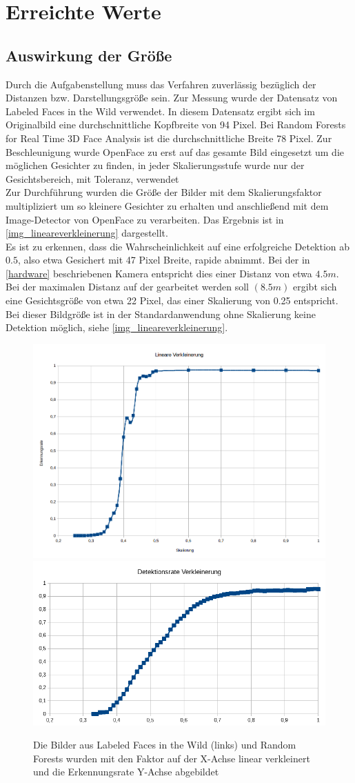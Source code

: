 \section{Erreichte Werte}
\subsection{Auswirkung der Größe}
Durch die Aufgabenstellung muss das Verfahren zuverlässig bezüglich der Distanzen bzw. Darstellungsgröße sein. Zur Messung wurde der Datensatz von Labeled Faces in the Wild \cite{database_Face} verwendet. In diesem Datensatz ergibt sich im Originalbild eine durchschnittliche Kopfbreite von 94 Pixel. Bei Random Forests for Real Time 3D Face Analysis \cite{database_Face_Ori} ist die durchschnittliche Breite 78 Pixel. Zur Beschleunigung wurde OpenFace zu erst auf das gesamte Bild eingesetzt um die möglichen Gesichter zu finden, in jeder Skalierungsstufe wurde nur der Gesichtsbereich, mit Toleranz, verwendet\\
Zur Durchführung wurden die Größe der Bilder mit dem Skalierungsfaktor multipliziert um so kleinere Gesichter zu erhalten und anschließend mit dem Image-Detector von OpenFace zu verarbeiten. Das Ergebnis ist in \autoref{img_lineareverkleinerung} dargestellt.\\
Es ist zu erkennen, dass die Wahrscheinlichkeit auf eine erfolgreiche Detektion ab $0.5$, also etwa Gesichert mit 47 Pixel Breite, rapide abnimmt. Bei der in \autoref{hardware} beschriebenen Kamera entspricht dies einer Distanz von etwa $4.5m$.\\
Bei der maximalen Distanz auf der gearbeitet werden soll $(8.5m)$ ergibt sich eine Gesichtsgröße von etwa 22 Pixel, das einer Skalierung von 0.25 entspricht. Bei dieser Bildgröße ist in der Standardanwendung ohne Skalierung keine Detektion möglich, siehe \autoref{img_lineareverkleinerung}.
\begin{figure}
	\centering
	\includegraphics[width=0.45\linewidth]{img/lineare_Verkleinerung}
	\includegraphics[width=0.45\linewidth]{img/lineare_Verkleinerung2}
	\caption{Die Bilder aus Labeled Faces in the Wild \cite{database_Face} (links) und Random Forests \cite{database_Face_Ori} wurden mit den Faktor auf der X-Achse linear verkleinert und die Erkennungsrate Y-Achse abgebildet}
	\label{img_lineareverkleinerung}
\end{figure}
